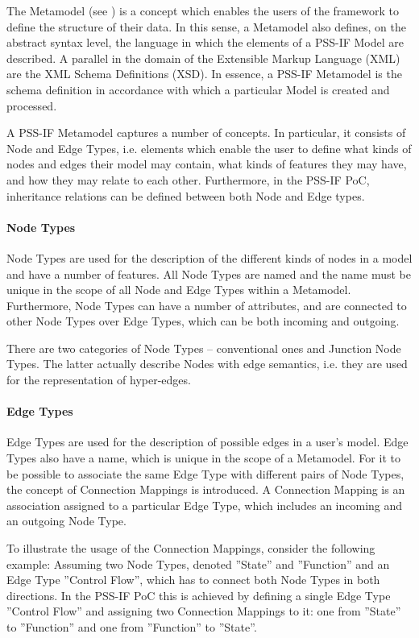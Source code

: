 The Metamodel (see ) is a concept which enables the users of the framework to define the structure of their data. In this sense, a Metamodel also defines, on the abstract syntax level, the language in which the elements of a PSS-IF Model are described. A parallel in the domain of the Extensible Markup Language (XML) are the XML Schema Definitions (XSD). In essence, a PSS-IF Metamodel is the schema definition in accordance with which a particular Model is created and processed.

A PSS-IF Metamodel captures a number of concepts. In particular, it consists of Node and Edge Types, i.e. elements which enable the user to define what kinds of nodes and edges their model may contain, what kinds of features they may have, and how they may relate to each other. Furthermore, in the PSS-IF PoC, inheritance relations can be defined between both Node and Edge types.

\paragraph{Node Types}

Node Types are used for the description of the different kinds of nodes in a model and have a number of features. All Node Types are named and the name must be unique in the scope of all Node and Edge Types within a Metamodel. Furthermore, Node Types can have a number of attributes, and are connected to other Node Types over Edge Types, which can be both incoming and outgoing.

There are two categories of Node Types -- conventional ones and Junction Node Types. The latter actually describe Nodes with edge semantics, i.e. they are used for the representation of hyper-edges.

\paragraph{Edge Types}

Edge Types are used for the description of possible edges in a user's model. Edge Types also have a name, which is unique in the scope of a Metamodel. For it to be possible to associate the same Edge Type with different pairs of Node Types, the concept of Connection Mappings is introduced. A Connection Mapping is an association assigned to a particular Edge Type, which includes an incoming and an outgoing Node Type.

To illustrate the usage of the Connection Mappings, consider the following example: Assuming two Node Types, denoted ''State'' and ''Function'' and an Edge Type ''Control Flow'', which has to connect both Node Types in both directions. In the PSS-IF PoC this is achieved by defining a single Edge Type ''Control Flow'' and assigning two Connection Mappings to it: one from ''State'' to ''Function'' and one from ''Function'' to ''State''.

